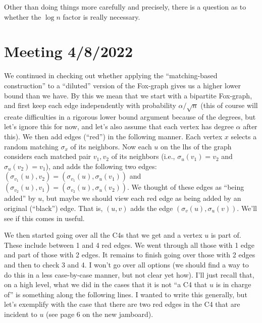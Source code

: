 \documentclass{article}
\begin{document}
Other than doing things more carefully and precisely, there is a question as to whether the $\log n$ factor is really necessary.

\section{Meeting 4/8/2022}

We continued in checking out whether applying the ``matching-based construction'' to a ``diluted'' version of the Fox-graph gives us a higher lower bound than we have. By this we mean that we start with a bipartite Fox-graph, and first keep each edge independently with probability $\alpha/\sqrt{n}$ (this of course will create difficulties in a rigorous lower bound argument because of the degrees, but let's ignore this for now, and let's also assume that each vertex has degree $\alpha$ after this). We then add edges (``red'') in the following manner. Each vertex $x$ selects a random matching $\sigma_x$ of its neighbors. Now each $u$ on the lhs of the graph considers each matched pair $v_1,v_2$ of its neighbors (i.e., $\sigma_u(v_1)=v_2$ and $\sigma_u(v_2)=v_1$), and adds the following two edges: $(\sigma_{v_1}(u),v_2)=(\sigma_{v_1}(u),\sigma_u(v_1))$ and
$(\sigma_{v_2}(u),v_1)= (\sigma_{v_2}(u),\sigma_{u}(v_2))$. We thought of these edges as ``being added'' by $u$, but maybe we should view each red edge as being added by an original (``black'') edge. That is, $(u,v)$ adds the edge $(\sigma_v(u),\sigma_u(v))$. We'll see if this comes in useful.

We then started going over all the C4s that we get and a vertex $u$ is part of. These include between 1 and 4 red edges. We went through all those with 1 edge and part of those with 2 edges. It remains to finish going over those with 2 edges and then to check 3 and 4. I won't go over all options (we should find a way to do this in a less case-by-case manner, but not clear yet how). I'll just recall that, on a high level, what we did in the cases that it is not ``a C4 that $u$ is in charge of'' is something along the following lines. I wanted to write this generally, but let's exemplify with the case that there are two red edges in the C4 that are incident to $u$ (see page 6 on the new jamboard).
\end{document}
